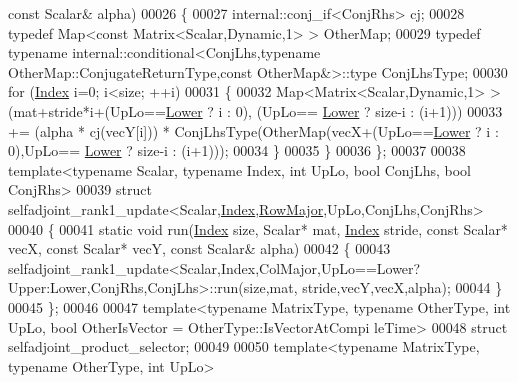 \begin{DoxyCode}
{      const} Scalar& alpha)
00026   \{
00027     internal::conj\_if<ConjRhs> cj;
00028     \textcolor{keyword}{typedef} Map<const Matrix<Scalar,Dynamic,1> > OtherMap;
00029     \textcolor{keyword}{typedef} \textcolor{keyword}{typename} internal::conditional<ConjLhs,typename OtherMap::ConjugateReturnType,const
       OtherMap&>::type ConjLhsType;
00030     \textcolor{keywordflow}{for} (\hyperlink{namespace_eigen_a62e77e0933482dafde8fe197d9a2cfde}{Index} i=0; i<size; ++i)
00031     \{
00032       Map<Matrix<Scalar,Dynamic,1> >(mat+stride*i+(UpLo==\hyperlink{group__enums_gga39e3366ff5554d731e7dc8bb642f83cda891792b8ed394f7607ab16dd716f60e6}{Lower} ? i : 0), (UpLo==
      \hyperlink{group__enums_gga39e3366ff5554d731e7dc8bb642f83cda891792b8ed394f7607ab16dd716f60e6}{Lower} ? size-i : (i+1)))
00033           += (alpha * cj(vecY[i])) * ConjLhsType(OtherMap(vecX+(UpLo==\hyperlink{group__enums_gga39e3366ff5554d731e7dc8bb642f83cda891792b8ed394f7607ab16dd716f60e6}{Lower} ? i : 0),UpLo==
      \hyperlink{group__enums_gga39e3366ff5554d731e7dc8bb642f83cda891792b8ed394f7607ab16dd716f60e6}{Lower} ? size-i : (i+1)));
00034     \}
00035   \}
00036 \};
00037 
00038 \textcolor{keyword}{template}<\textcolor{keyword}{typename} Scalar, \textcolor{keyword}{typename} Index, \textcolor{keywordtype}{int} UpLo, \textcolor{keywordtype}{bool} ConjLhs, \textcolor{keywordtype}{bool} ConjRhs>
00039 \textcolor{keyword}{struct }selfadjoint\_rank1\_update<Scalar,\hyperlink{namespace_eigen_a62e77e0933482dafde8fe197d9a2cfde}{Index},\hyperlink{group__enums_ggaacded1a18ae58b0f554751f6cdf9eb13acfcde9cd8677c5f7caf6bd603666aae3}{RowMajor},UpLo,ConjLhs,ConjRhs>
00040 \{
00041   \textcolor{keyword}{static} \textcolor{keywordtype}{void} run(\hyperlink{namespace_eigen_a62e77e0933482dafde8fe197d9a2cfde}{Index} size, Scalar* mat, \hyperlink{namespace_eigen_a62e77e0933482dafde8fe197d9a2cfde}{Index} stride, \textcolor{keyword}{const} Scalar* vecX, \textcolor{keyword}{const} Scalar* vecY, \textcolor{keyword}{
      const} Scalar& alpha)
00042   \{
00043     selfadjoint\_rank1\_update<Scalar,Index,ColMajor,UpLo==Lower?Upper:Lower,ConjRhs,ConjLhs>::run(size,mat,
      stride,vecY,vecX,alpha);
00044   \}
00045 \};
00046 
00047 \textcolor{keyword}{template}<\textcolor{keyword}{typename} MatrixType, \textcolor{keyword}{typename} OtherType, \textcolor{keywordtype}{int} UpLo, \textcolor{keywordtype}{bool} OtherIsVector = OtherType::IsVectorAtCompi
      leTime>
00048 \textcolor{keyword}{struct }selfadjoint\_product\_selector;
00049 
00050 \textcolor{keyword}{template}<\textcolor{keyword}{typename} MatrixType, \textcolor{keyword}{typename} OtherType, \textcolor{keywordtype}{int} UpLo>

\end{DoxyCode}
